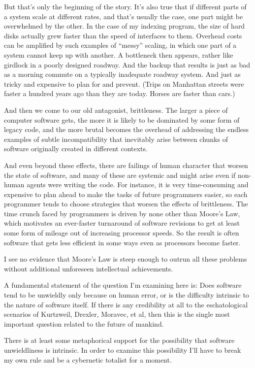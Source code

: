 \documentclass[letterpaper,12pt,english]{sphinxmanual}
\begin{document}
But that's only the beginning of the story. It's also true that if different parts of a system scale at different rates, and that's usually the case, one part might be overwhelmed by the other. In the case of my indexing program, the size of hard disks actually grew faster than the speed of interfaces to them. Overhead costs can be amplified by such examples of ``messy'' scaling, in which one part of a system cannot keep up with another. A bottleneck then appears, rather like girdlock in a poorly designed roadway. And the backup that results is just as bad as a morning commute on a typically inadequate roadway system. And just as tricky and expensive to plan for and prevent. (Trips on Manhattan streets were faster a hundred years ago than they are today. Horses are faster than cars.)

And then we come to our old antagonist, brittleness. The larger a piece of computer software gets, the more it is likely to be dominated by some form of legacy code, and the more brutal becomes the overhead of addressing the endless examples of subtle incompatibility that inevitably arise between chunks of software originally created in different contexts.

And even beyond these effects, there are failings of human character that worsen the state of software, and many of these are systemic and might arise even if non-human agents were writing the code. For instance, it is very time-consuming and expensive to plan ahead to make the tasks of future programmers easier, so each programmer tends to choose strategies that worsen the effects of brittleness. The time crunch faced by programmers is driven by none other than Moore's Law, which motivates an ever-faster turnaround of software revisions to get at least some form of mileage out of increasing processor speeds. So the result is often software that gets less efficient in some ways even as processors become faster.

I see no evidence that Moore's Law is steep enough to outrun all these problems without additional unforeseen intellectual achievements.

A fundamental statement of the question I'm examining here is: Does software tend to be unwieldly only because on human error, or is the difficulty intrinsic to the nature of software itself. If there is any credibility at all to the eschatological scenarios of Kurtzweil, Drexler, Moravec, et al, then this is the single most important question related to the future of mankind.

There is at least some metaphorical support for the possibility that software unwieldliness is intrinsic. In order to examine this possibility I'll have to break my own rule and be a cybernetic totalist for a moment.
\end{document}
